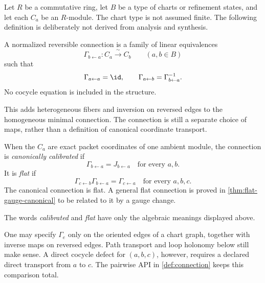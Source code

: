 Let $R$ be a commutative ring, let $B$ be a type of charts or refinement
states, and let each $C_a$ be an $R$-module.  The chart type is not assumed
finite.  The following definition is deliberately not derived from analysis
and synthesis.

\begin{definition}
\label{def:connection}
A normalized reversible connection is a family of linear equivalences
\[
\Gamma_{b\leftarrow a}:C_a\xrightarrow{\;\sim\;}C_b
\qquad(a,b\in B)
\]
such that
\[
\Gamma_{a\leftarrow a}=\id,
\qquad
\Gamma_{a\leftarrow b}=\Gamma_{b\leftarrow a}^{-1}.
\]
No cocycle equation is included in the structure.
\end{definition}

This adds heterogeneous fibers and inversion on reversed edges to the
homogeneous minimal connection.  The connection is still a separate choice
of maps, rather than a definition of canonical coordinate transport.

\begin{definition}
\label{def:calibration-flatness}
When the $C_a$ are exact packet coordinates of one ambient module, the
connection is \emph{canonically calibrated} if
\[
\Gamma_{b\leftarrow a}=J_{b\leftarrow a}
\quad\text{for every }a,b.
\]
It is \emph{flat} if
\[
\Gamma_{c\leftarrow b}\Gamma_{b\leftarrow a}
=
\Gamma_{c\leftarrow a}
\quad\text{for every }a,b,c.
\]
The canonical connection is flat.  A general flat connection is proved in
\cref{thm:flat-gauge-canonical} to be related to it by a gauge change.
\end{definition}

The words \emph{calibrated} and \emph{flat} have only the algebraic meanings
displayed above.

\begin{remark}
One may specify $\Gamma_e$ only on the oriented edges of a chart graph,
together with inverse maps on reversed edges.  Path transport and loop
holonomy below still make sense.  A direct cocycle defect for $(a,b,c)$,
however, requires a declared direct transport from $a$ to $c$.  The pairwise
API in \cref{def:connection} keeps this comparison total.
\end{remark}


